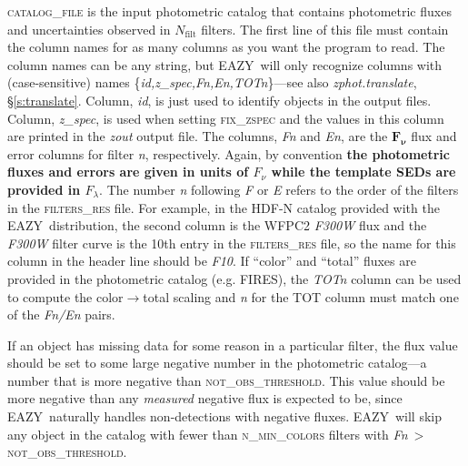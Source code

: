\documentclass[11pt]{article}
\newcommand{\eazy}{\textsc{EAZY}}
\begin{document}
\vspace*{0.25cm}\textsc{catalog\_file} is the input photometric catalog that
contains photometric fluxes and uncertainties observed in $N_\mathrm{filt}$
filters.  The first line of this file must contain the column names for as many
columns as you want the program to read.  The column names can be any string,
but \eazy\ will only recognize columns with (case-sensitive) names
\{\textsl{id,z\_spec,Fn,En,TOTn}\}---see also \textit{zphot.translate},
\S\ref{s:translate}.  Column, \textsl{id}, is just used to identify objects in
the output files.  Column, \textsl{z\_spec}, is used when setting
\textsc{fix\_zspec} and the values in this column are printed in the
\textit{zout} output file.  The columns, \textsl{Fn} and \textsl{En}, are the
$\mathbf{F_\nu}$ flux and error columns for filter \textsl{n}, respectively. 
Again, by convention \textbf{the photometric fluxes and errors are given in
units of $F_\nu$ while the template SEDs are provided in $F_\lambda$}.  The
number \textsl{n} following \textsl{F} or \textsl{E} refers to the order of the
filters in the \textsc{filters\_res} file.  For example, in the HDF-N catalog
provided with the \eazy\ distribution, the second column is the WFPC2
\textsl{F300W} flux and the \textsl{F300W} filter curve is the 10th entry in
the \textsc{filters\_res} file, so the name for this column in the header line
should be \textsl{F10}.  If ``color'' and ``total'' fluxes are provided in the
photometric catalog (e.g. FIRES), the \textsl{TOTn} column can be used to
compute the color$\rightarrow$total scaling and \textsl{n} for the TOT column
must match one of the \textsl{Fn/En} pairs.

If an object has missing data for some reason in a particular filter, the flux
value should be set to some large negative number in the photometric
catalog---a number that is more negative than \textsc{not\_obs\_threshold}. 
This value should be more negative than any \textit{measured} negative flux is
expected to be, since \eazy\ naturally handles non-detections with negative
fluxes.  \eazy\ will skip any object in the catalog with fewer than
\textsc{n\_min\_colors} filters with \textsl{Fn}$\ >\
$\textsc{not\_obs\_threshold}.
\end{document}
